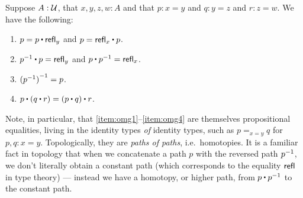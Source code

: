 \begin{lem}\label{thm:omg}%
  Suppose $A:\mathcal{U}$, that $x,y,z,w:A$ and that $p:x= y$ and $q:y = z$ and $r:z=w$.
  We have the following:
  \begin{enumerate}
  \item $p= p\ct \refl{y}$ and $p = \refl{x} \ct p$.\label{item:omg1}
  \item $\opp{p}\ct p=  \refl{y}$ and $p\ct \opp{p}= \refl{x}$.\label{item:omg2}
  \item $\mathord{{(\mathord{{p}^{-1}})}^{-1}}= p$.\label{item:omg3}
  \item $p\ct (q\ct r)=  (p\ct q)\ct r$.\label{item:omg4}
  \end{enumerate}
\end{lem}

Note, in particular, that \ref{item:omg1}--\ref{item:omg4} are themselves propositional equalities, living in the identity types \emph{of} identity types, such as $p=_{x=y}q$ for $p,q:x=y$.
Topologically, they are \emph{paths of paths}, i.e.\ homotopies.
It is a familiar fact in topology that when we concatenate a path $p$ with the reversed path $\mathord{{p}^{-1}}$, we don't literally obtain a constant path (which corresponds to the equality $\mathsf{refl}_{}$ in type theory) --- instead we have a homotopy, or higher path, from $p\ct\opp p$ to the constant path.

